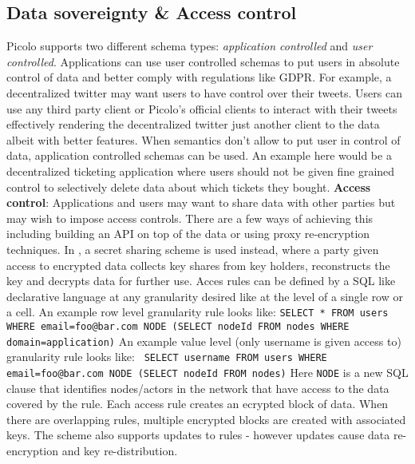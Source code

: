 \subsection{Data sovereignty \& Access control} \label{sec:access_control}
Picolo supports two different schema types: \textit{application controlled} and \textit{user controlled}. Applications can use user controlled schemas to put users in absolute control of data and better comply with regulations like GDPR. For example, a decentralized twitter may  want users to have control over their tweets. Users can use any third party client or Picolo's official clients to interact with their tweets effectively rendering the decentralized twitter just another client to the data albeit with better features. \newline\newline
When semantics don't allow to put user in control of data, application controlled schemas can be used. An example here would be a decentralized ticketing application where users should not be given fine grained control to selectively delete data about which tickets they bought.
\newline\newline
\textbf{Access control}:
Applications and users may want to share data with other parties but may wish to impose access controls. There are a few ways of achieving this including building an API on top of the data or using proxy re-encryption techniques. In \cite{ac_p2p_db}, a secret sharing scheme is used instead, where a party given access to encrypted data collects key shares from key holders, reconstructs the key and decrypts data for further use. Acces rules can be defined by a SQL like declarative language at any granularity desired like at the level of a single row or a cell. An example row level granularity rule looks like:\newline \newline
\texttt{SELECT  * \newline FROM users \newline WHERE email=foo@bar.com \newline NODE (SELECT nodeId FROM nodes WHERE domain=application)} \newline \newline
An example value level (only username is given access to) granularity rule looks like:\newline \newline
\texttt{ SELECT username \newline FROM users \newline WHERE email=foo@bar.com \newline NODE (SELECT nodeId FROM nodes)}\newline\newline
Here \texttt{NODE} is a new SQL clause that identifies nodes/actors in the network that have access to the data covered by the rule. Each access rule creates an ecrypted block of data. When there are overlapping rules, multiple encrypted blocks are created with associated keys. The scheme also supports updates to rules - however updates cause data re-encryption and key re-distribution.

